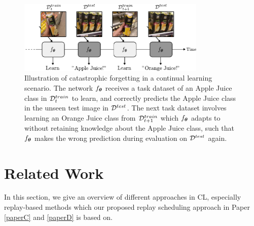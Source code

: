 \begin{figure}[t]
	\centering
	\includegraphics[width=0.8\textwidth]{Chapter4/imgs/cf_new.pdf}
	\caption{Illustration of catastrophic forgetting in a continual learning scenario. The network $f_{{\bm{\theta}}}$ receives a task dataset of an Apple Juice class in ${\mathcal{D}}_{t}^{train}$ to learn, and correctly predicts the Apple Juice class in the unseen test image in ${\mathcal{D}}^{test}$. The next task dataset involves learning an Orange Juice class from ${\mathcal{D}}_{t+1}^{train}$ which $f_{{\bm{\theta}}}$ adapts to without retaining knowledge about the Apple Juice class, such that $f_{{\bm{\theta}}}$ makes the wrong prediction during evaluation on ${\mathcal{D}}^{test}$ again. }
	\vspace{-2mm}
	\label{fig:catastrophic_forgetting_example}
\end{figure}


\section{Related Work}\label{chap4:sec:related_work}

In this section, we give an overview of different approaches in CL, especially replay-based methods which our proposed replay scheduling approach in Paper \ref{paperC} and \ref{paperD} is based on. 

\vspace{-3mm}

